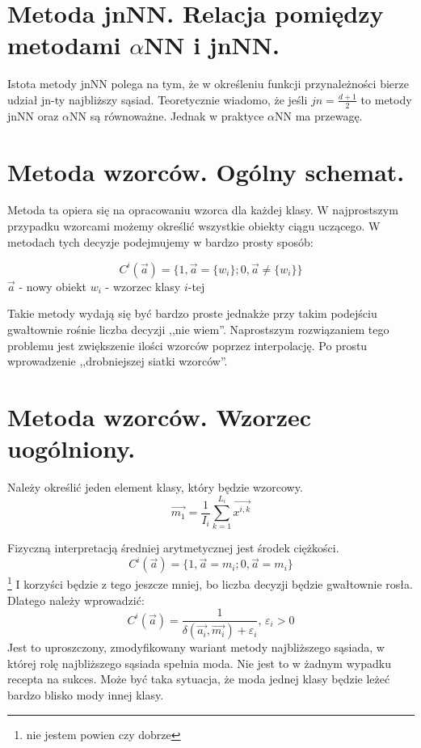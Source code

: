 \documentclass[a4paper,10pt]{article}
\begin{document}
\section{Metoda jnNN. Relacja pomiędzy metodami $\alpha$NN i jnNN.}
Istota metody jnNN polega na tym, że w określeniu funkcji przynależności bierze udział jn-ty najbliższy sąsiad. Teoretycznie wiadomo, że jeśli $jn=\frac{d+1}{2}$ to metody jnNN oraz $\alpha$NN są równoważne. Jednak w praktyce $\alpha$NN ma przewagę.

\section{Metoda wzorców. Ogólny schemat.}
Metoda ta opiera się na opracowaniu wzorca dla każdej klasy. W najprostszym przypadku wzorcami możemy określić wszystkie obiekty ciągu uczącego. W metodach tych decyzje podejmujemy w bardzo prosty sposób:

\begin{equation}
 C^i(\overrightarrow{a}) = \{1, \overrightarrow{a} = \{w_i\} ; 0, \overrightarrow{a} \neq \{w_i\} \}
\end{equation}
$\overrightarrow{a}$ - nowy obiekt
$w_i$ - wzorzec klasy $i$-tej

Takie metody wydają się być bardzo proste jednakże przy takim podejściu gwałtownie rośnie liczba decyzji ,,nie wiem''.
Naprostszym rozwiązaniem tego problemu jest zwiększenie ilości wzorców poprzez interpolację. Po prostu wprowadzenie ,,drobniejszej siatki wzorców''.

\section{Metoda wzorców. Wzorzec uogólniony.}
Należy określić jeden element klasy, który będzie wzorcowy. 
\begin{equation}
  \overrightarrow{m_1} = \frac{1}{I_i} \sum_{k=1}^{L_i} \overrightarrow{x^{i,k}}
\end{equation}

Fizyczną interpretacją średniej arytmetycznej jest środek ciężkości.
\begin{equation}
C^i(\overrightarrow{a}) = \{1, \overrightarrow{a} = m_i ; 0, \overrightarrow{a} = m_i\}
\end{equation}\footnote{nie jestem powien czy dobrze}
I korzyści będzie z tego jeszcze mniej, bo liczba decyzji będzie gwałtownie rosła. Dlatego należy wprowadzić:
\begin{equation}
C^i(\overrightarrow{a}) = \frac{1}{\delta(\overrightarrow{a_i}, \overrightarrow{m_i}) + \varepsilon_i}\mbox{, }    \varepsilon_i > 0 
\end{equation}
Jest to uproszczony, zmodyfikowany wariant metody najbliższego sąsiada, w której rolę najbliższego sąsiada spełnia moda.
Nie jest to w żadnym wypadku recepta na sukces. Może być taka sytuacja, że moda jednej klasy będzie leżeć bardzo blisko mody innej klasy.
\end{document}
